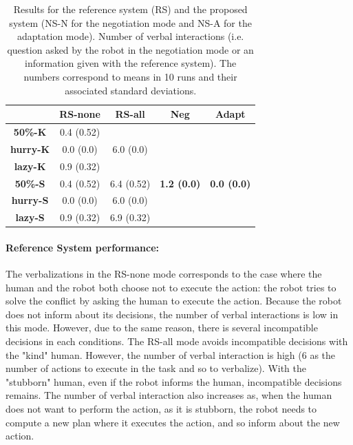 \documentclass[english,a4paper,11pt,twoside]{StyleThese}
\begin{document}
\begin{table}[!h]
\centering
  \begin{tabular}{|c||c|c|c|c|}
  \hline
     & \textbf{RS-none} & \textbf{RS-all} & \textbf{Neg} & \textbf{Adapt} \\
  \hline
  \hline
     \textbf{50\%-K} & 0.4 (0.52) &  &  &  \\
  \cline{1-2}
     \textbf{hurry-K} & 0.0 (0.0) & 6.0 (0.0) & &  \\
  \cline{1-2}
     \textbf{lazy-K} & 0.9 (0.32) &  &  &  \\
  \cline{1-3}
     \textbf{50\%-S} & 0.4 (0.52) & 6.4 (0.52) &\textbf{ 1.2 (0.0)} & \textbf{0.0 (0.0)} \\
  \cline{1-3}
     \textbf{hurry-S} & 0.0 (0.0) & 6.0 (0.0) &  & \\
  \cline{1-3}
     \textbf{lazy-S} & 0.9 (0.32) & 6.9 (0.32) & & \\
  \hline
  \end{tabular}
   \caption{Results for the reference system (RS) and the proposed system (NS-N for the negotiation mode and NS-A for the adaptation mode). Number of verbal interactions (i.e. question asked by the robot in the negotiation mode or an information given with the reference system). The numbers correspond to means in 10 runs and their associated standard deviations.}
   \label{tab:verb}
\end{table}


\paragraph{Reference System performance:} 
The verbalizations in the RS-none mode corresponds to the case where the human and the robot both choose not to execute the action: the robot tries to solve the conflict by asking the human to execute the action. Because the robot does not inform about its decisions, the number of verbal interactions is low in this mode. However, due to the same reason, there is several incompatible decisions in each conditions. The RS-all mode avoids incompatible decisions with the "kind" human. However, the number of verbal interaction is high (6 as the number of actions to execute in the task and so to verbalize). With the "stubborn" human, even if the robot informs the human, incompatible decisions remains. The number of verbal interaction also increases as, when the human does not want to perform the action, as it is stubborn, the robot needs to compute a new plan where it executes the action, and so inform about the new action.
\end{document}
